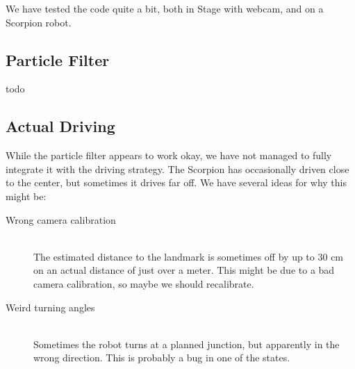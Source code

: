 \documentclass[a4paper,12pt]{article}
\begin{document}
We have tested the code quite a bit, both in Stage with webcam, and on a
Scorpion robot.

\subsection{Particle Filter}

todo


\subsection{Actual Driving}

While the particle filter appears to work okay, we have not managed to fully
integrate it with the driving strategy.  The Scorpion has occasionally driven
close to the center, but sometimes it drives far off.  We have several ideas for
why this might be:

\begin{description}
\item[Wrong camera calibration]\hfill\\
The estimated distance to the landmark is sometimes off by up to 30 cm on an
actual distance of just over a meter.  This might be due to a bad camera
calibration, so maybe we should recalibrate.

\item[Weird turning angles]\hfill\\
Sometimes the robot turns at a planned junction, but apparently in the wrong
direction.  This is probably a bug in one of the states.
\end{description}
\end{document}
